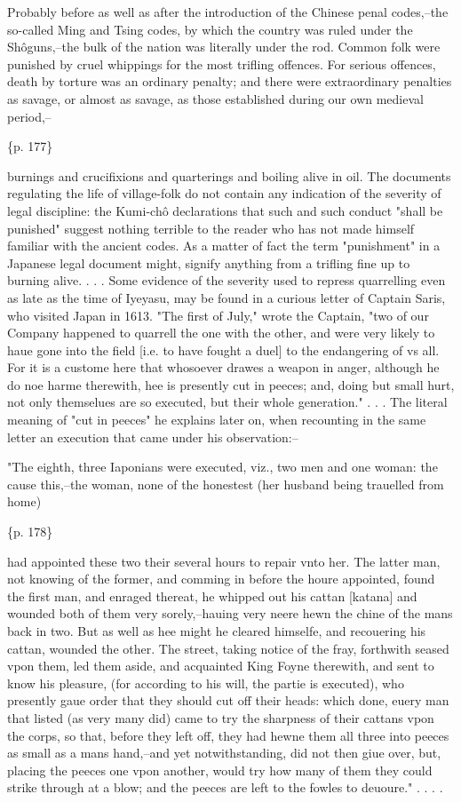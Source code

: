 Probably before as well as after the introduction of the Chinese penal codes,--the so-called Ming and Tsing codes, by which the country was ruled under the Shôguns,--the bulk of the nation was literally under the rod. Common folk were punished by cruel whippings for the most trifling offences. For serious offences, death by torture was an ordinary penalty; and there were extraordinary penalties as savage, or almost as savage, as those established during our own medieval period,--

\{p. 177\}

burnings and crucifixions and quarterings and boiling alive in oil. The documents regulating the life of village-folk do not contain any indication of the severity of legal discipline: the Kumi-chô declarations that such and such conduct "shall be punished" suggest nothing terrible to the reader who has not made himself familiar with the ancient codes. As a matter of fact the term "punishment" in a Japanese legal document might, signify anything from a trifling fine up to burning alive. . . . Some evidence of the severity used to repress quarrelling even as late as the time of Iyeyasu, may be found in a curious letter of Captain Saris, who visited Japan in 1613. "The first of July," wrote the Captain, "two of our Company happened to quarrell the one with the other, and were very likely to haue gone into the field [i.e. to have fought a duel] to the endangering of vs all. For it is a custome here that whosoever drawes a weapon in anger, although he do noe harme therewith, hee is presently cut in peeces; and, doing but small hurt, not only themselues are so executed, but their whole generation." . . . The literal meaning of "cut in peeces" he explains later on, when recounting in the same letter an execution that came under his observation:--

"The eighth, three Iaponians were executed, viz., two men and one woman: the cause this,--the woman, none of the honestest (her husband being trauelled from home)

\{p. 178\}

had appointed these two their several hours to repair vnto her. The latter man, not knowing of the former, and comming in before the houre appointed, found the first man, and enraged thereat, he whipped out his cattan [katana] and wounded both of them very sorely,--hauing very neere hewn the chine of the mans back in two. But as well as hee might he cleared himselfe, and recouering his cattan, wounded the other. The street, taking notice of the fray, forthwith seased vpon them, led them aside, and acquainted King Foyne therewith, and sent to know his pleasure, (for according to his will, the partie is executed), who presently gaue order that they should cut off their heads: which done, euery man that listed (as very many did) came to try the sharpness of their cattans vpon the corps, so that, before they left off, they had hewne them all three into peeces as small as a mans hand,--and yet notwithstanding, did not then giue over, but, placing the peeces one vpon another, would try how many of them they could strike through at a blow; and the peeces are left to the fowles to deuoure." . . . .

